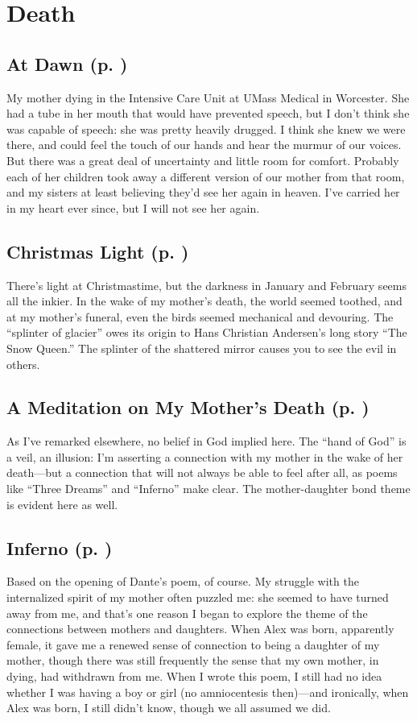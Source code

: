 \section*{Death}

\subsection*{At Dawn (p. \pageref{ch:atdawn})}
My mother dying in the Intensive Care Unit at UMass Medical in Worcester. She
had a tube in her mouth that would have prevented speech, but I don't think she
was capable of speech: she was pretty heavily drugged. I think she knew we were
there, and could feel the touch of our hands and hear the murmur of our voices.
But there was a great deal of uncertainty and little room for comfort. Probably
each of her children took away a different version of our mother from that room,
and my sisters at least believing they'd see her again in heaven. I've carried
her in my heart ever since, but I will not see her again.

\subsection*{Christmas Light (p. \pageref{ch:christmaslight})}
There's light at Christmastime, but the darkness in January and February seems
all the inkier. In the wake of my mother's death, the world seemed toothed, and
at my mother's funeral, even the birds seemed mechanical and devouring. The
``splinter of glacier'' owes its origin to Hans Christian Andersen's long story
``The Snow Queen.'' The splinter of the shattered mirror causes you to see the
evil in others.

\subsection*{A Meditation on My Mother's Death (p. \pageref{ch:ameditation})}
As I've remarked elsewhere, no belief in God implied here. The ``hand of God''
is a veil, an illusion: I'm asserting a connection with my mother in the wake of
her death---but a connection that will not always be able to feel after all, as
poems like ``Three Dreams'' and ``Inferno'' make clear. The mother-daughter bond
theme is evident here as well.

\subsection*{Inferno (p. \pageref{ch:inferno})}
Based on the opening of Dante's poem, of course. My struggle with the
internalized spirit of my mother often puzzled me: she seemed to have turned
away from me, and that's one reason I began to explore the theme of the
connections between mothers and daughters. When Alex was born, apparently
female, it gave me a renewed sense of connection to being a daughter of my
mother, though there was still frequently the sense that my own mother, in
dying, had withdrawn from me. When I wrote this poem, I still had no idea
whether I was having a boy or girl (no amniocentesis then)---and ironically,
when Alex was born, I still didn't know, though we all assumed we did.

